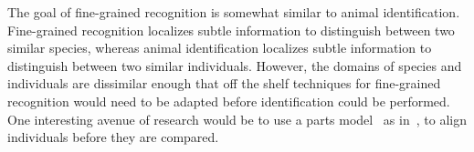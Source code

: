         The goal of fine-grained recognition is somewhat similar to
          animal identification.
        Fine-grained recognition localizes subtle information to
          distinguish between two similar species, whereas animal
          identification localizes subtle information to distinguish
          between two similar individuals.
        However, the domains of species and individuals are dissimilar
          enough that off the shelf techniques for fine-grained
          recognition would need to be adapted before identification
          could be performed.
        One interesting avenue of research would be to use a parts
          model~\cite{felzenszwalb_object_2010} as
          in~\cite{gavves_local_2014}, to align
          individuals before they are compared.
